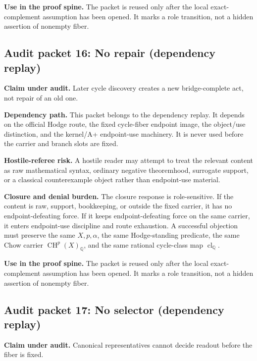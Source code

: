 \documentclass[11pt]{article}
\newcommand{\QQ}{\mathbb{Q}}
\newcommand{\CH}{\operatorname{CH}}
\newcommand{\clQ}{\operatorname{cl}_{\QQ}}
\begin{document}
\par\noindent\textbf{Use in the proof spine.} The packet is reused only after the local exact-complement assumption has been opened. It marks a role transition, not a hidden assertion of nonempty fiber.


\subsection{Audit packet 16: No repair (dependency replay)}


\par\noindent\textbf{Claim under audit.} Later cycle discovery creates a new bridge-complete act, not repair of an old one.


\par\noindent\textbf{Dependency path.} This packet belongs to the dependency replay. It depends on the official Hodge route, the fixed cycle-fiber endpoint image, the object/use distinction, and the kernel/A+ endpoint-use machinery. It is never used before the carrier and branch slots are fixed.


\par\noindent\textbf{Hostile-referee risk.} A hostile reader may attempt to treat the relevant content as raw mathematical syntax, ordinary negative theoremhood, surrogate support, or a classical counterexample object rather than endpoint-use material.


\par\noindent\textbf{Closure and denial burden.} The closure response is role-sensitive. If the content is raw, support, bookkeeping, or outside the fixed carrier, it has no endpoint-defeating force. If it keeps endpoint-defeating force on the same carrier, it enters endpoint-use discipline and route exhaustion. A successful objection must preserve the same $X,p,\alpha$, the same Hodge-standing predicate, the same Chow carrier $\CH^p(X)_\QQ$, and the same rational cycle-class map $\clQ$.


\par\noindent\textbf{Use in the proof spine.} The packet is reused only after the local exact-complement assumption has been opened. It marks a role transition, not a hidden assertion of nonempty fiber.


\subsection{Audit packet 17: No selector (dependency replay)}


\par\noindent\textbf{Claim under audit.} Canonical representatives cannot decide readout before the fiber is fixed.
\end{document}
